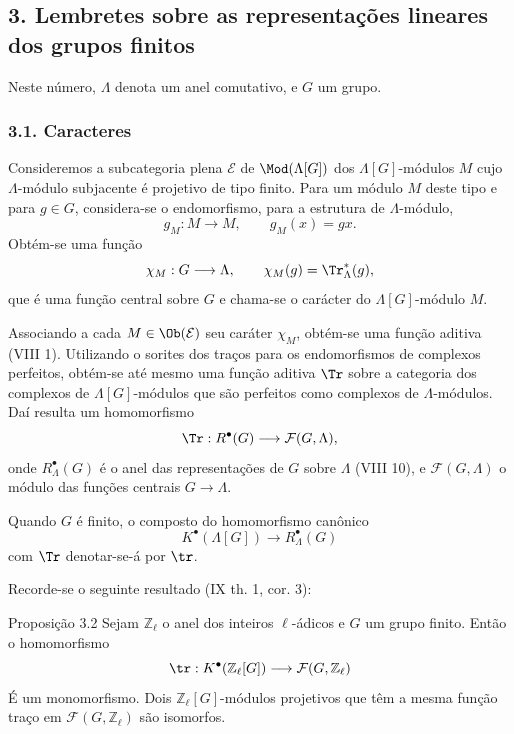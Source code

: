 \subsection*{3. Lembretes sobre as representações lineares dos grupos finitos}

Neste número, $\Lambda$ denota um anel comutativo, e $G$ um grupo.

\subsubsection*{3.1. Caracteres}

Consideremos a subcategoria plena $\mathcal E$ de $\Mod(\Lambda[G])$ dos $\Lambda[G]$-módulos $M$ cujo $\Lambda$-módulo subjacente é projetivo de tipo finito. Para um módulo $M$ deste tipo e para $g\in G$, considera-se o endomorfismo, para a estrutura de $\Lambda$-módulo,
\[
g_M:M\longrightarrow M,
\qquad g_M(x)=gx.
\]
Obtém-se uma função
\[
\chi_M:G\longrightarrow \Lambda,
\qquad \chi_M(g)=\Tr^*_\Lambda(g),
\]
que é uma função central sobre $G$ e chama-se o carácter do $\Lambda[G]$-módulo $M$.

Associando a cada $M\in\Ob(\mathcal E)$ seu caráter $\chi_M$, obtém-se uma função aditiva (VIII 1). Utilizando o sorites dos traços para os endomorfismos de complexos perfeitos, obtém-se até mesmo uma função aditiva $\Tr$ sobre a categoria dos complexos de $\Lambda[G]$-módulos que são perfeitos como complexos de $\Lambda$-módulos. Daí resulta um homomorfismo
\[
\Tr:R^{\bullet}(G)\longrightarrow \mathcal F(G,\Lambda),
\]
onde $R^{\bullet}_{\Lambda}(G)$ é o anel das representações de $G$ sobre $\Lambda$ (VIII 10), e $\mathcal F(G,\Lambda)$ o módulo das funções centrais $G\to\Lambda$.

Quando $G$ é finito, o composto do homomorfismo canônico
\[
K^{\bullet}(\Lambda[G])\longrightarrow R^{\bullet}_{\Lambda}(G)
\]
com $\Tr$ denotar-se-á por $\tr$.

Recorde-se o seguinte resultado (IX th. 1, cor. 3):

\begin{statement}{Proposição 3.2}
Sejam $\mathbb Z_\ell$ o anel dos inteiros $\ell$-ádicos e $G$ um grupo finito. Então o homomorfismo
\[
\tr:K^{\bullet}(\mathbb Z_\ell[G])\longrightarrow \mathcal F(G,\mathbb Z_\ell)
\]
É um monomorfismo. Dois $\mathbb Z_\ell[G]$-módulos projetivos que têm a mesma função traço em $\mathcal F(G,\mathbb Z_\ell)$ são isomorfos.
\end{statement}
